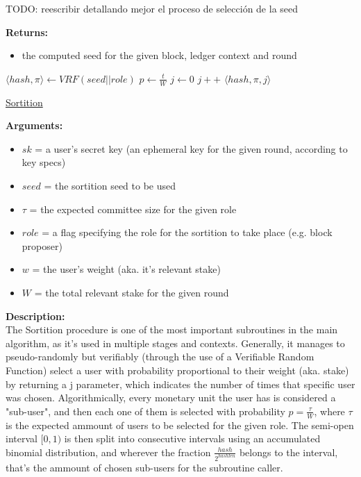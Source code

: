 \documentclass[10pt,a4paper]{article}
\begin{document}
TODO: reescribir detallando mejor el proceso de selección de la seed

\noindent \textbf{Returns:}
\begin{itemize}
    \item the computed seed for the given block, ledger context and round
  \end{itemize}

\begin{algorithm}[H]
    \begin{algorithmic}[H]
        \State $ \langle hash, \pi \rangle \gets VRF(seed||role)$
        \State $p \gets \frac{t}{W}$
        \State $j \gets 0$
        \While{$\frac{hash}{2^{hashlen}}\notin [ \sum_{k=0}^jB(k;w,p), \sum_{k=0}^{j+1}B(k;w,p))$}
            \State $j++$
        \EndWhile
        \Return $ \langle hash,\pi,j \rangle$
    \EndFunction
    \end{algorithmic}
    \caption{\underline{Sortition}}
\end{algorithm}


\noindent \textbf{Arguments:}
\begin{itemize}
    \item $sk$ = a user's secret key (an ephemeral key for the given round, according to key specs)
    \item $seed$ = the sortition seed to be used
    \item $\tau$ = the expected committee size for the given role
    \item $role$ = a flag specifying the role for the sortition to take place (e.g. block proposer)
    \item $w$ = the user's weight (aka. it's relevant stake)
    \item $W$ = the total relevant stake for the given round
\end{itemize}

\noindent \textbf{Description:}\\
The Sortition procedure is one of the most important subroutines in the main algorithm, as it's used in multiple stages and contexts.
Generally, it manages to pseudo-randomly but verifiably (through the use of a Verifiable Random Function) select a user with probability proportional
to their weight (aka. stake) by returning a j parameter, which indicates the number of times that specific user was chosen.
Algorithmically, every monetary unit the user has is considered a "sub-user", and then each one of them is selected with probability $p = \frac{\tau}{W}$,
where $\tau$ is the expected ammount of users to be selected for the given role.
The semi-open interval $[0,1)$ is then split into consecutive intervals using an accumulated binomial distribution, and wherever the fraction $\frac{hash}{2^{hashlen}}$
belongs to the interval, that's the ammount of chosen sub-users for the subroutine caller.\\
\end{document}
